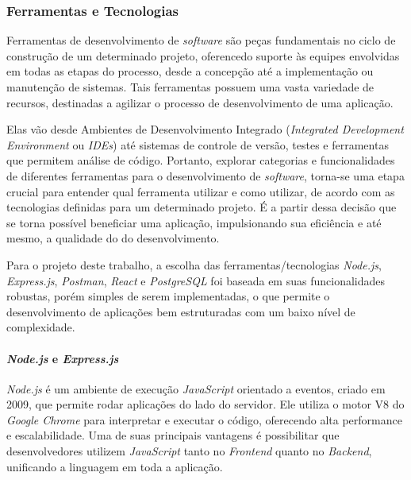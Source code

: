 \documentclass[english,brazilian]{UNISINOSartigo} %
\begin{document}
\subsubsection{Ferramentas e Tecnologias}

Ferramentas de desenvolvimento de \textit{software} são peças fundamentais no ciclo de construção de um determinado projeto, oferencedo suporte às equipes envolvidas em todas as etapas do processo, desde a concepção até a implementação ou manutenção de sistemas. Tais ferramentas possuem uma vasta variedade de recursos, destinadas a agilizar o processo de desenvolvimento de uma aplicação.

Elas vão desde Ambientes de Desenvolvimento Integrado (\textit{Integrated Development Environment} ou \textit{IDEs}) até sistemas de controle de versão, testes e ferramentas que permitem análise de código. Portanto, explorar categorias e funcionalidades de diferentes ferramentas para o desenvolvimento de \textit{software}, torna-se uma etapa crucial para entender qual ferramenta utilizar e como utilizar, de acordo com as tecnologias definidas para um determinado projeto. É a partir dessa decisão que se torna possível beneficiar uma aplicação, impulsionando sua eficiência e até mesmo, a qualidade do do desenvolvimento.

Para o projeto deste trabalho, a escolha das ferramentas/tecnologias \textit{Node.js}, \textit{Express.js}, \textit{Postman}, \textit{React} e \textit{PostgreSQL} foi baseada em suas funcionalidades robustas, porém simples de serem implementadas, o que permite o desenvolvimento de aplicações bem estruturadas com um baixo nível de complexidade.


\paragraph{\textit{Node.js} e \textit{Express.js}}

\textit{Node.js} é um ambiente de execução \textit{JavaScript} orientado a eventos, criado em 2009, que permite rodar aplicações do lado do servidor. Ele utiliza o motor V8 do \textit{Google Chrome} para interpretar e executar o código, oferecendo alta performance e escalabilidade. Uma de suas principais vantagens é possibilitar que desenvolvedores utilizem \textit{JavaScript} tanto no \textit{Frontend} quanto no \textit{Backend}, unificando a linguagem em toda a aplicação.
\end{document}
